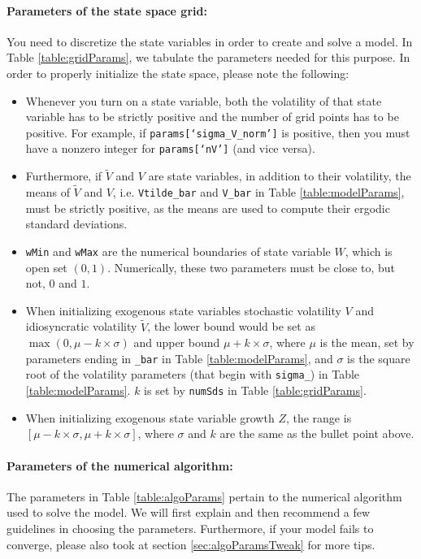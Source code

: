 \documentclass[12pt]{article}
\newcommand{\wealthSymbol}{$W$\xspace}
\newcommand{\stochasticVolSymbol}{$V$\xspace}
\newcommand{\growthSymbol}{$Z$\xspace}
\newcommand{\idioVolSymbol}{$\widetilde{V}$\xspace}
\newcommand{\meanIdioVolProg}{Vtilde\_bar\xspace}
\newcommand{\meanStochasticVolProg}{V\_bar\xspace}
\newcommand{\stochasticVolVolProg}{sigma\_V\_norm\xspace}
\newcommand{\nStochasaticVolProg}{nV\xspace}
\newcommand{\wealthMinProg}{wMin\xspace}
\newcommand{\wealthMaxProg}{wMax\xspace}
\begin{document}
\paragraph{Parameters of the state space grid:} You need to discretize the state variables in order to create and solve a model. In Table \ref{table:gridParams}, we tabulate the parameters needed for this purpose. In order to properly initialize the state space, please note the following:
\begin{itemize}
\item Whenever you turn on a state variable, both the volatility of that state variable has to be strictly positive and the number of grid points has to be positive. For example, if \texttt{params[`\stochasticVolVolProg']} is positive, then you must have a nonzero integer for \texttt{params[`\nStochasaticVolProg']} (and vice versa).
\item Furthermore, if \idioVolSymbol and \stochasticVolSymbol are state variables, in addition to their volatility, the means of \idioVolSymbol and \stochasticVolSymbol, i.e. \texttt{\meanIdioVolProg} and \texttt{\meanStochasticVolProg} in Table \ref{table:modelParams}, must be strictly positive, as the means are used to compute their ergodic standard deviations.
\item \texttt{\wealthMinProg} and \texttt{\wealthMaxProg} are the numerical boundaries of state variable \wealthSymbol, which is open set $(0,1)$. Numerically, these two parameters must be close to, but not, $0$ and $1$.
\item When initializing exogenous state variables stochastic volatility \stochasticVolSymbol and idiosyncratic volatility \idioVolSymbol, the lower bound would be set as $\max(0, \mu - k \times \sigma)$ and upper bound $\mu + k \times \sigma$, where $\mu$ is the mean, set by parameters ending in \texttt{\_bar} in Table \ref{table:modelParams}, and $\sigma$ is the square root of the volatility parameters (that begin with \texttt{sigma\_}) in Table \ref{table:modelParams}. $k$ is set by \texttt{numSds} in Table \ref{table:gridParams}.
\item When initializing exogenous state variable growth \growthSymbol, the range is $[\mu - k \times \sigma, \mu + k \times \sigma]$, where $\sigma$ and $k$ are the same as the bullet point above.
\end{itemize}

\paragraph{Parameters of the numerical algorithm:} The parameters in Table \ref{table:algoParams} pertain to the numerical algorithm used to solve the model.  We will first explain and then recommend a few guidelines in choosing the parameters. Furthermore, if your model fails to converge, please also took at section \ref{sec:algoParamsTweak} for more tips.
\end{document}
